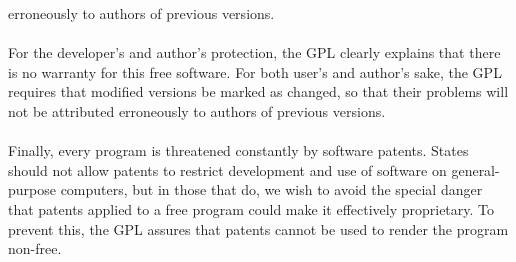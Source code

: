 erroneously to authors of previous versions.\\\\
For the developer’s and author’s protection, the GPL clearly explains that there is no
warranty for this free software. For both user’s and author’s sake, the GPL requires that
modiﬁed versions be marked as changed, so that their problems will not be attributed
erroneously to authors of previous versions.\\\\
Finally, every program is threatened constantly by software patents. States should not
allow patents to restrict development and use of software on general-purpose computers,
but in those that do, we wish to avoid the special danger that patents applied to a free
program could make it eﬀectively proprietary. To prevent this, the GPL assures that
patents cannot be used to render the program non-free.\\\\




 

